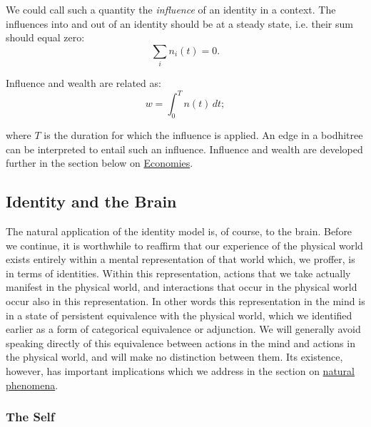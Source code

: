 \documentclass[pra,twocolumn,groupedaddress,10pt]{revtex4}
\theoremstyle{definition}
\begin{document}
We could call such a quantity the \textit{influence} of an identity in a context. The influences into and out of an identity should be at a steady state, i.e. their sum should equal zero:
\begin{equation}
	\sum_{i} n_i(t) = 0 .
\end{equation}

Influence and wealth are related as:
\begin{equation}
	w = \! \int_{0}^{T} n(t)\,dt \label{eq:influence} ;
\end{equation}

where $T$ is the duration for which the influence is applied. An edge in a bodhitree can be interpreted to entail such an influence. Influence and wealth are developed further in the section below on \hyperref[sec:ecogovintpro]{Economies}.

\subsection{Identity and the Brain} \label{sec:idebra}

The natural application of the identity model is, of course, to the brain. Before we continue, it is worthwhile to reaffirm that our experience of the physical world exists entirely within a mental representation of that world which, we proffer, is in terms of identities. Within this representation, actions that we take actually manifest in the physical world, and interactions that occur in the physical world occur also in this representation. In other words this representation in the mind is in a state of persistent equivalence with the physical world, which we identified earlier as a form of categorical equivalence or adjunction. We will generally avoid speaking directly of this equivalence between actions in the mind and actions in the physical world, and will make no distinction between them. Its existence, however, has important implications which we address in the section on \hyperref[sec:natphe]{natural phenomena}.

\subsubsection{The Self} \label{sec:theself}
\end{document}
